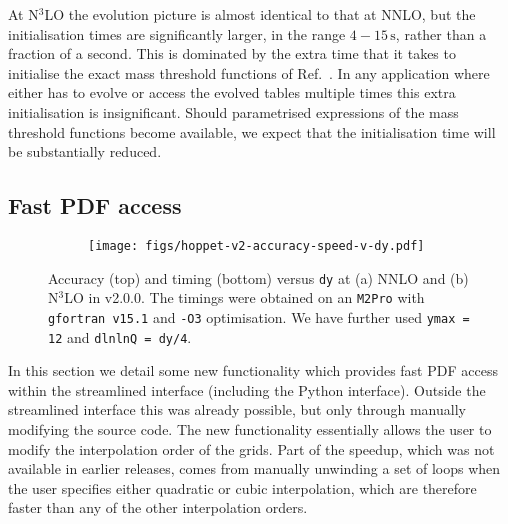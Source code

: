 At N$^3$LO the evolution picture is almost identical to that at NNLO,
but the initialisation times are significantly larger, in the range
$4-15\, \mathrm{s}$, rather than a fraction of a second.
%
This is dominated by the extra time that it takes
to initialise the exact mass threshold functions of
Ref.~\cite{BlumleinCode}.
%
In any application where \hoppet{} either
has to evolve or access the evolved tables multiple times this extra
initialisation is insignificant.
%
Should parametrised expressions of the mass threshold functions become
available, we expect that the initialisation time will be
substantially reduced.


\subsection{Fast PDF access}
\label{sec:fastpdf}


\begin{figure}[htbp]
    \centering
    \begin{subfigure}{0.49\textwidth}
        \centering
        \texttt{[image: figs/hoppet-v2-accuracy-speed-v-dy.pdf]}
        \caption{}
        \label{fig:sub2}
    \end{subfigure}
    \caption{Accuracy (top) and timing (bottom) versus \texttt{dy} at
      (a) NNLO and (b) N$^3$LO in \hoppet{} v2.0.0. The timings were
      obtained on an \texttt{M2Pro} with \texttt{gfortran v15.1} and
      \texttt{-O3} optimisation. We have further used \texttt{ymax = 12} and
      \texttt{dlnlnQ = dy/4}.
    }
    \label{fig:main}
\end{figure}

In this section we detail some new functionality which provides fast
PDF access within the streamlined interface (including the Python
interface). Outside the streamlined interface this was already
possible, but only through manually modifying the source code. The new
functionality essentially allows the user to modify the interpolation
order of the \hoppet{} grids. Part of the speedup, which was not
available in earlier releases, comes from manually unwinding a set of
loops when the user specifies either quadratic or cubic interpolation,
which are therefore faster than any of the other interpolation orders.

